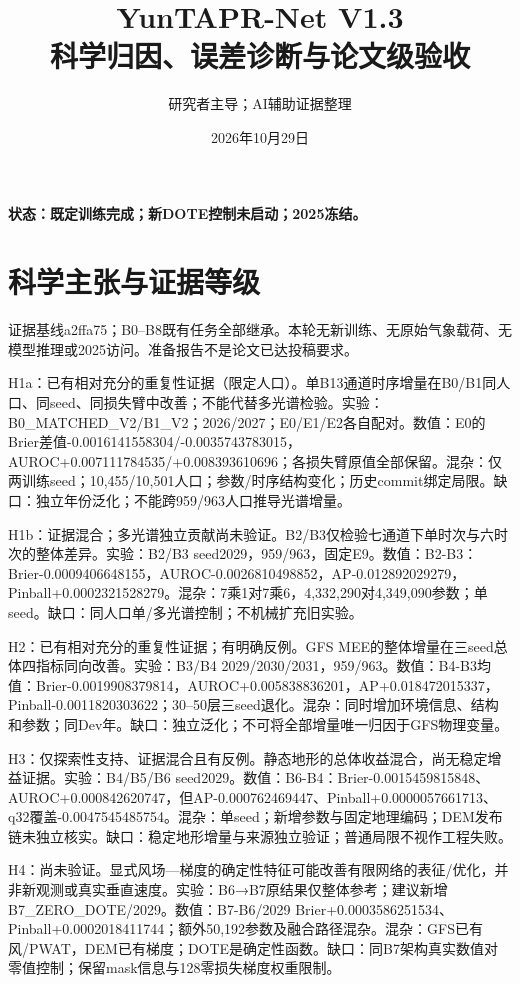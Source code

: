 \documentclass[UTF8,a4paper,10pt,fontset=none]{ctexart}
\title{YunTAPR-Net V1.3\\科学归因、误差诊断与论文级验收}
\author{研究者主导；AI辅助证据整理}\date{2026年10月29日}
\begin{document}
\maketitle
\textbf{状态：既定训练完成；新DOTE控制未启动；2025冻结。}

\section{科学主张与证据等级}
证据基线a2ffa75；B0–B8既有任务全部继承。本轮无新训练、无原始气象载荷、无模型推理或2025访问。准备报告不是论文已达投稿要求。

H1a：已有相对充分的重复性证据（限定人口）。单B13通道时序增量在B0/B1同人口、同seed、同损失臂中改善；不能代替多光谱检验。实验：B0\_MATCHED\_V2/B1\_V2；2026/2027；E0/E1/E2各自配对。数值：E0的Brier差值-0.0016141558304/-0.0035743783015，AUROC+0.007111784535/+0.008393610696；各损失臂原值全部保留。混杂：仅两训练seed；10,\allowbreak{}455/10,\allowbreak{}501人口；参数/时序结构变化；历史commit绑定局限。缺口：独立年份泛化；不能跨959/963人口推导光谱增量。

H1b：证据混合；多光谱独立贡献尚未验证。B2/B3仅检验七通道下单时次与六时次的整体差异。实验：B2/B3 seed2029，959/963，固定E9。数值：B2-B3：Brier-0.0009406648155，AUROC-0.0026810498852，AP-0.012892029279，Pinball+0.0002321528279。混杂：7乘1对7乘6，4,\allowbreak{}332,\allowbreak{}290对4,\allowbreak{}349,\allowbreak{}090参数；单seed。缺口：同人口单/多光谱控制；不机械扩充旧实验。

H2：已有相对充分的重复性证据；有明确反例。GFS MEE的整体增量在三seed总体四指标同向改善。实验：B3/B4 2029/2030/2031，959/963。数值：B4-B3均值：Brier-0.0019908379814，AUROC+0.005838836201，AP+0.018472015337，Pinball-0.0011820303622；30–50层三seed退化。混杂：同时增加环境信息、结构和参数；同Dev年。缺口：独立泛化；不可将全部增量唯一归因于GFS物理变量。

H3：仅探索性支持、证据混合且有反例。静态地形的总体收益混合，尚无稳定增益证据。实验：B4/B5/B6 seed2029。数值：B6-B4：Brier-0.0015459815848、AUROC+0.000842620747，但AP-0.000762469447、Pinball+0.0000057661713、q32覆盖-0.0047545485754。混杂：单seed；新增参数与固定地理编码；DEM发布链未独立核实。缺口：稳定地形增量与来源独立验证；普通局限不视作工程失败。

H4：尚未验证。显式风场—梯度的确定性特征可能改善有限网络的表征/优化，并非新观测或真实垂直速度。实验：B6→B7原结果仅整体参考；建议新增B7\_ZERO\_DOTE/2029。数值：B7-B6/2029 Brier+0.0003586251534、Pinball+0.0002018411744；额外50,\allowbreak{}192参数及融合路径混杂。混杂：GFS已有风/PWAT，DEM已有梯度；DOTE是确定性函数。缺口：同B7架构真实数值对零值控制；保留mask信息与128零损失梯度权重限制。
\end{document}
